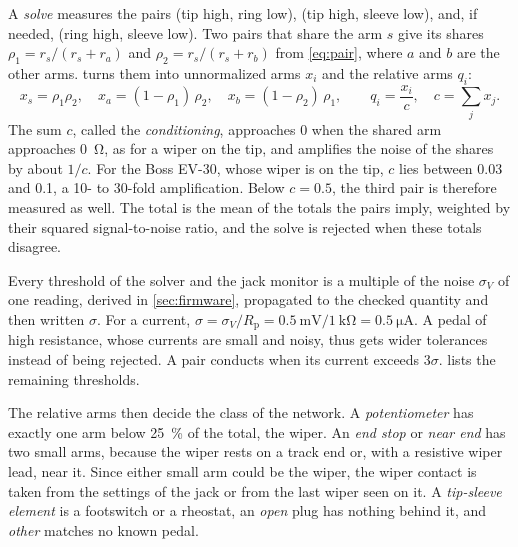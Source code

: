 A \emph{solve} measures the pairs (tip high, ring low), (tip high, sleeve low), and, if needed, (ring high, sleeve low). Two pairs that share the arm $s$ give its shares $\rho_1 = r_s/(r_s + r_a)$ and $\rho_2 = r_s/(r_s + r_b)$ from \cref{eq:pair}, where $a$ and $b$ are the other arms.  turns them into unnormalized arms $x_i$ and the relative arms $q_i$:
\begin{equation}
  x_s = \rho_1 \rho_2,\quad x_a = (1 - \rho_1)\,\rho_2,\quad x_b = (1 - \rho_2)\,\rho_1,\qquad
  q_i = \frac{x_i}{c},\quad c = \sum_j x_j.
  \label{eq:ratios}
\end{equation}
The sum $c$, called the \emph{conditioning}, approaches 0 when the shared arm approaches \qty{0}{\ohm}, as for a wiper on the tip, and amplifies the noise of the shares by about $1/c$. For the Boss EV-30, whose wiper is on the tip, $c$ lies between 0.03 and 0.1, a 10- to 30-fold amplification. Below $c = 0.5$, the third pair is therefore measured as well. The total is the mean of the totals the pairs imply, weighted by their squared signal-to-noise ratio, and the solve is rejected when these totals disagree.

Every threshold of the solver and the jack monitor is a multiple of the noise $\sigma_V$ of one reading, derived in \cref{sec:firmware}, propagated to the checked quantity and then written $\sigma$. For a current, $\sigma = \sigma_V/R_\mathrm{p} = \qty{0.5}{\milli\volt}/\qty{1}{\kilo\ohm} = \qty{0.5}{\micro\ampere}$. A pedal of high resistance, whose currents are small and noisy, thus gets wider tolerances instead of being rejected. A pair conducts when its current exceeds $3\sigma$.  lists the remaining thresholds.

The relative arms then decide the class of the network. A \emph{potentiometer} has exactly one arm below \qty{25}{\percent} of the total, the wiper. An \emph{end stop} or \emph{near end} has two small arms, because the wiper rests on a track end or, with a resistive wiper lead, near it. Since either small arm could be the wiper, the wiper contact is taken from the settings of the jack or from the last wiper seen on it. A \emph{tip-sleeve element} is a footswitch or a rheostat, an \emph{open} plug has nothing behind it, and \emph{other} matches no known pedal.
